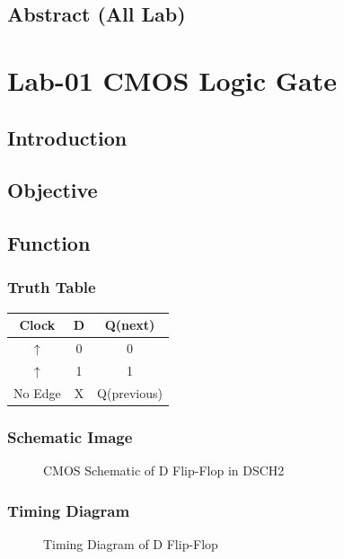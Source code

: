 \documentclass[12pt]{report}
\begin{document}
\tableofcontents
\thispagestyle{empty}
\clearpage
{}

\section*{\center Abstract (All Lab)}


\newpage
\chapter{Lab-01 CMOS Logic Gate}
\section{Introduction}


\section{Objective}


\section{Function}



\subsection*{Truth Table}
\begin{center}
\begin{tabular}{|c|c|c|}
\hline
Clock & D & Q(next) \\ \hline
$\uparrow$ & 0 & 0 \\
$\uparrow$ & 1 & 1 \\
No Edge & X & Q(previous) \\ \hline
\end{tabular}
\end{center}

\subsection*{Schematic Image}
\begin{figure}[!h]
\centering
\caption{CMOS Schematic of D Flip-Flop in DSCH2}
\end{figure}


\subsection*{Timing Diagram}
\begin{figure}[!h]
\centering
\caption{Timing Diagram of D Flip-Flop}
\end{figure}
\end{document}
